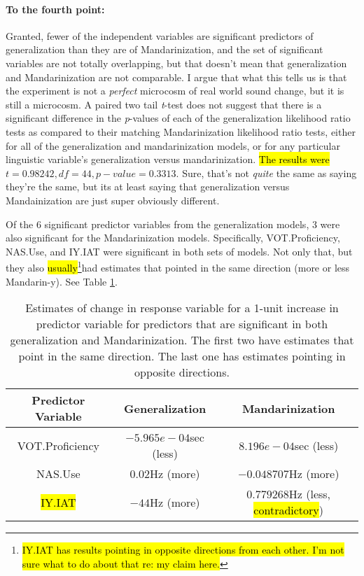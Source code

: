 \paragraph{To the fourth point:}
Granted, fewer of the independent variables are significant predictors of generalization than they are of Mandarinization, and the set of significant variables are not totally overlapping, but that doesn't mean that generalization and Mandarinization are not comparable. I argue that what this tells us is that the experiment is not a \emph{perfect} microcosm of real world sound change, but it is still a microcosm. A paired two tail \textit{t}-test does not suggest that there is a significant difference in the \textit{p}-values of each of the generalization likelihood ratio tests as compared to their matching Mandarinization likelihood ratio tests, either for all of the generalization and mandarinization models, or for any particular linguistic variable's generalization versus mandarinization. \hl{The results were} $t = 0.98242, df = 44, p-value = 0.3313$. Sure, that's not \emph{quite} the same as saying they're the same, but its at least saying that generalization versus Mandainization are just super obviously different.

Of the 6 significant predictor variables from the generalization models, 3 were also significant for the Mandarinization models. Specifically, VOT.Proficiency, NAS.Use, and IY.IAT were significant in both sets of models. Not only that, but they also \hl{usually}\footnote{\hl{IY.IAT has results pointing in opposite directions from each other. I'm not sure what to do about that re: my claim here.}}had estimates that pointed in the same direction (more or less Mandarin-y). See Table \ref{tab:sigInBothEstimates}.

\begin{table}[]
    \centering
    \begin{tabular}{|c|c|c|}
        \hline
        \textbf{Predictor Variable} & \textbf{Generalization} & \textbf{Mandarinization}\\
        \hline
        VOT.Proficiency & $-5.965e-04$sec (less) & $8.196e-04$sec (less) \\ %
        \hline
        NAS.Use &  $0.02$Hz (more) & $-0.048707$Hz (more) \\
        \hline
        \hl{IY.IAT} &  $-44$Hz (more)& $0.779268$Hz (less, \hl{contradictory}) \\
        \hline
    \end{tabular}
    \caption{Estimates of change in response variable for a 1-unit increase in predictor variable for predictors that are significant in both generalization and Mandarinization. The first two have estimates that point in the same direction. The last one has estimates pointing in opposite directions.}
    \label{tab:sigInBothEstimates}
\end{table}

